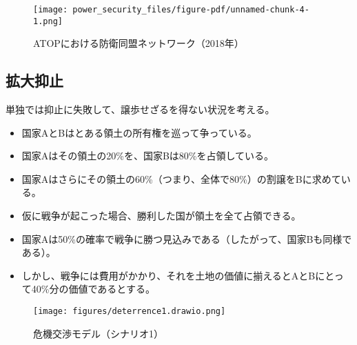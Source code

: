 \documentclass[
  xelatex,
  ja=standard]{bxjsarticle}
\providecommand{\tightlist}{%
  \setlength{\itemsep}{0pt}\setlength{\parskip}{0pt}}\usepackage{longtable,booktabs,array}
\begin{document}
\begin{figure}[htpb]

{\centering \texttt{[image: power\_security\_files/figure-pdf/unnamed-chunk-4-1.png]}

}

\caption{ATOPにおける防衛同盟ネットワーク（2018年）}

\end{figure}

\hypertarget{ux62e1ux5927ux6291ux6b62}{%
\subsection{拡大抑止}\label{ux62e1ux5927ux6291ux6b62}}

単独では抑止に失敗して、譲歩せざるを得ない状況を考える。

\begin{tcolorbox}[enhanced jigsaw, colback=white, leftrule=.75mm, bottomrule=.15mm, opacityback=0, opacitybacktitle=0.6, toptitle=1mm, bottomtitle=1mm, toprule=.15mm, coltitle=black, title=\textcolor{quarto-callout-tip-color}{\faLightbulb}\hspace{0.5em}{国際危機のシナリオ1}, titlerule=0mm, colbacktitle=quarto-callout-tip-color!10!white, breakable, arc=.35mm, colframe=quarto-callout-tip-color-frame, rightrule=.15mm, left=2mm]

\begin{itemize}
\tightlist
\item
  国家AとBはとある領土の所有権を巡って争っている。
\item
  国家Aはその領土の20\%を、国家Bは80\%を占領している。
\item
  国家Aはさらにその領土の60\%（つまり、全体で80\%）の割譲をBに求めている。
\item
  仮に戦争が起こった場合、勝利した国が領土を全て占領できる。
\item
  国家Aは50\%の確率で戦争に勝つ見込みである（したがって、国家Bも同様である）。
\item
  しかし、戦争には費用がかかり、それを土地の価値に揃えるとAとBにとって40\%分の価値であるとする。
\end{itemize}

\end{tcolorbox}

\begin{figure}[htpb]

{\centering \texttt{[image: figures/deterrence1.drawio.png]}

}

\caption{危機交渉モデル（シナリオ1）}

\end{figure}
\end{document}
